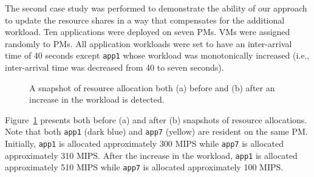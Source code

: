 The second case study was performed to demonstrate the ability of our approach to update the resource shares in a way that compensates for the additional workload. Ten applications were deployed on seven PMs.  VMs were assigned randomly to PMs.  All application workloads were set to have an inter-arrival time of 40 seconds except \texttt{app1} whose workload was monotonically increased (i.e., inter-arrival time was decreased from 40 to seven seconds).
\begin{figure}[h]
	\centering
	\qquad
	\caption[A snapshot of resource allocation both before and after an increase in the workload is detected.]
	{A snapshot of resource allocation both (a) before and (b) after an increase in the workload is detected.}	\label{fig:case-study2} 
\end{figure}
Figure~\ref{fig:case-study2} presents both before (a) and after (b) snapshots of resource allocations.  Note that both \texttt{app1} (dark blue) and \texttt{app7} (yellow) are resident on the same PM.  Initially, \texttt{app1} is allocated approximately 300 MIPS while \texttt{app7} is allocated approximately 310 MIPS. After the increase in the workload, \texttt{app1} is allocated approximately 510 MIPS while \texttt{app7} is allocated approximately 100 MIPS.


